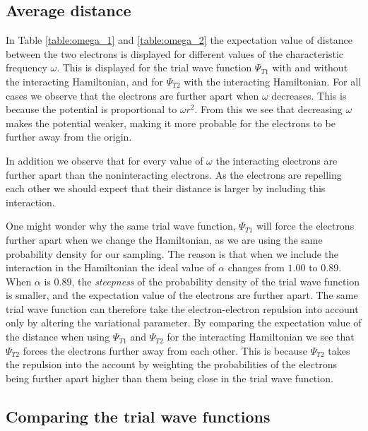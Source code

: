 \documentclass[%
 reprint,
nofootinbib,
aps,
]{revtex4-1}
\begin{document}
\subsection{Average distance}
In Table \ref{table:omega_1} and \vref{table:omega_2} the expectation value of distance between the two electrons is displayed for different values of the characteristic frequency $\omega$. This is displayed for the trial wave function $\Psi_{T1}$ with and without the interacting Hamiltonian, and for $\Psi_{T2}$ with the interacting Hamiltonian. For all cases we observe that the electrons are further apart when $\omega$ decreases. This is because the potential is proportional to $\omega r^2$. From this we see that decreasing $\omega$ makes the potential weaker, making it more probable for the electrons to be further away from the origin.\par
In addition we observe that for every value of $\omega$ the interacting electrons are further apart than the noninteracting electrons. As the electrons are repelling each other we should expect that their distance is larger by including this interaction.\par
One might wonder why the same trial wave function, $\Psi_{T1}$ will force the electrons further apart when we change the Hamiltonian, as we are using the same probability density for our sampling. The reason is that when we include the interaction in the Hamiltonian the ideal value of $\alpha$ changes from $1.00$ to $0.89$. When $\alpha$ is $0.89$, the \textit{steepness} of the probability density of the trial wave function is smaller, and the expectation value of the electrons are further apart. The same trial wave function can therefore take the electron-electron repulsion into account only by altering the variational parameter. By comparing the expectation value of the distance when using $\Psi_{T1}$ and $\Psi_{T2}$ for the interacting Hamiltonian we see that $\Psi_{T2}$ forces the electrons further away from each other. This is because $\Psi_{T2}$ takes the repulsion into the account by weighting the probabilities of the electrons being further apart higher than them being close in the trial wave function.

\subsection{Comparing the trial wave functions}
\end{document}
